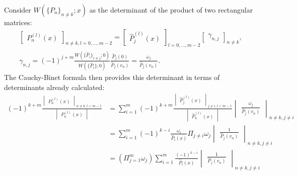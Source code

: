 \documentclass{book}
\begin{document}
Consider $W(\{P_n\}_{n \neq k} ; x)$ as the determinant of the product of two rectangular matrices:
\begin{align*}
\begin{bmatrix} P_n^{(l)}(x) \end{bmatrix}_{n \neq k, l = 0,...,m-2} = 
\begin{bmatrix} \hat{P}_j^{(l)}(x) \end{bmatrix}_{l=0,...,m-2}
\begin{bmatrix} \gamma_{n,j} \end{bmatrix}_{n \neq k}, \\
\gamma_{n,j} = (-1)^{j+m} \frac{ W(\{\hat{P}_i\}_{i \neq j} ; 0) }{ W(\{ \hat{P}_i \} ; 0) } \frac{\hat{P}_j(0)}{\hat{P}_j(v_n)} = \frac{\omega_j}{\hat{P}_j(v_n)} .
\end{align*}
The Cauchy-Binet formula then provides this determinant in terms of determinants already calculated:
\begin{align*}
(-1)^{k+m} \frac{\begin{vmatrix} P_n^{(l)}(x) \end{vmatrix}_{n \neq k, l < m-1}}{\begin{vmatrix} P_n^{(l)}(x) \end{vmatrix} } & = 
\sum_{i=1}^m (-1)^{k+m} \frac{\begin{vmatrix} \hat{P}_j^{(l)}(x) \end{vmatrix}_{j \neq i, l < m-1} }{
\begin{vmatrix} \hat{P}_n^{(l)}(x) \end{vmatrix} }
\begin{vmatrix} \frac{ \omega_j }{ \hat{P}_j(v_n) } \end{vmatrix}_{n \neq k, j \neq i} \\
& = \sum_{i=1}^m (-1)^{k-i} \frac{\omega_i}{\hat{P}_i(x)} \Pi_{j \neq i} \omega_j \begin{vmatrix} \frac{1}{\hat{P}_j(v_n)} \end{vmatrix}_{n \neq k, j \neq i} \\
& = \left ( \Pi_{j=1}^m \omega_j \right ) \sum_{i=1}^m \frac{(-1)^{k-i}}{\hat{P}_i(x)} \begin{vmatrix} \frac{1}{\hat{P}_j(v_n)} \end{vmatrix}_{n \neq k, j \neq i}
\end{align*}
\end{document}
